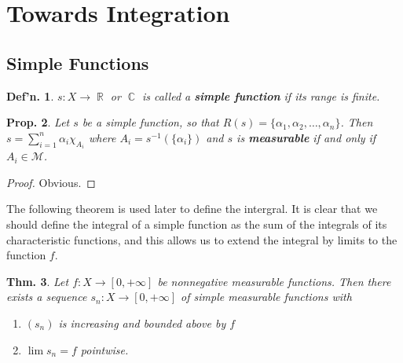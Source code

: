 \documentclass[12pt, a4paper]{book}
\DeclareMathOperator{\R}{\mathbb{R}}
\DeclareMathOperator{\C}{\mathbb{C}}
\newtheorem{theorem}{Thm.}[section]
\newtheorem{definition}[theorem]{Def'n.}
\newtheorem{proposition}[theorem]{Prop.}
\theoremstyle{nonumberplain}
\newtheorem{proof}{Proof}
\begin{document}
\section{Towards Integration}
\subsection{Simple Functions}
\begin{definition}
    $s:X\to\R$ or $\C$ is called a \textbf{simple function} if its range is finite.
\end{definition}
\begin{proposition}
    Let $s$ be a simple function, so that $R(s)=\{\alpha_1,\alpha_2,\ldots,\alpha_n\}$.
    Then $s=\sum\limits_{i=1}^n \alpha_i\chi_{A_i}$ where $A_i=s^{-1}(\{\alpha_i\})$ and $s$ is \textbf{measurable} if and only if $A_i\in\mathcal{M}$.
\end{proposition}
\begin{proof}
    Obvious.
\end{proof}
The following theorem is used later to define the intergral.
It is clear that we should define the integral of a simple function as the sum of the integrals of its characteristic functions, and this allows us to extend the integral by limits to the function $f$.
\begin{theorem}
    Let $f:X\to[0,+\infty]$ be nonnegative measurable functions.
    Then there exists a sequence $s_n:X\to[0,+\infty]$ of simple measurable functions with
    \begin{enumerate}[nolistsep]
        \item $(s_n)$ is increasing and bounded above by $f$
        \item $\lim s_n=f$ pointwise.
    \end{enumerate}
\end{theorem}
\end{document}
